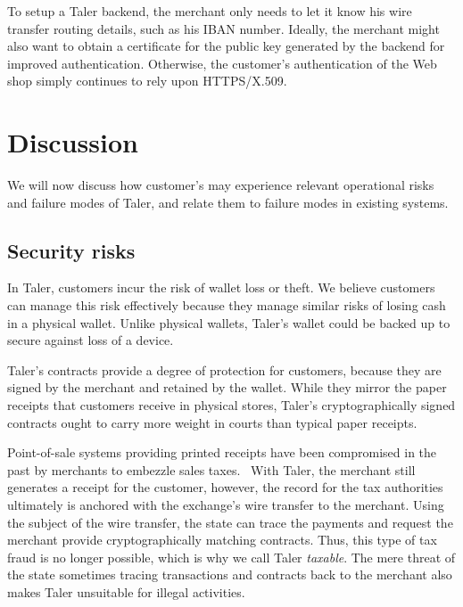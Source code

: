 \documentclass{IEEEtran}
\begin{document}
To setup a Taler backend, the merchant only needs to let it know his wire
transfer routing details, such as his IBAN number.  Ideally, the
merchant might also want to obtain a certificate for the public key
generated by the backend for improved authentication.  Otherwise, the
customer's authentication of the Web shop simply continues to rely
upon HTTPS/X.509.


\section{Discussion}

We will now discuss how customer's may experience relevant operational
risks and failure modes of Taler, and relate them to failure modes
in existing systems.

\subsection{Security risks}

In Taler, customers incur the risk of wallet loss or theft.  We
believe customers can manage this risk effectively because they manage
similar risks of losing cash in a physical wallet.  Unlike physical
wallets, Taler's wallet could be backed up to secure against loss of a
device.

Taler's contracts provide a degree of protection for customers,
because they are signed by the merchant and retained by the wallet.
While they mirror the paper receipts that customers receive in
physical stores, Taler's cryptographically signed contracts ought to
carry more weight in courts than typical paper receipts.

Point-of-sale systems providing printed receipts have been compromised
in the past by merchants to embezzle sales
taxes.~\cite{munichicecream} With Taler, the merchant still generates
a receipt for the customer, however, the record for the tax
authorities ultimately is anchored with the exchange's wire transfer
to the merchant.  Using the subject of the wire transfer, the state
can trace the payments and request the merchant provide
cryptographically matching contracts.  Thus, this type of tax
fraud is no longer possible, which is why we call Taler {\em
taxable}.  The mere threat of the state sometimes tracing transactions
and contracts back to the merchant also makes Taler unsuitable for
illegal activities.
\end{document}

